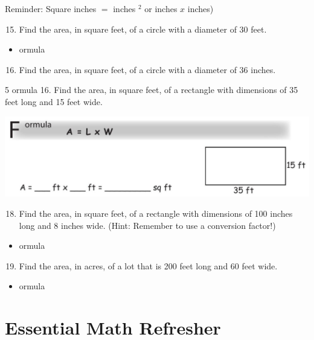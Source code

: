 \documentclass[10pt]{article}
\begin{document}
Reminder: Square inches $=$ inches $^{2}$ or inches $x$ inches)

\begin{enumerate}
  \setcounter{enumi}{14}
  \item Find the area, in square feet, of a circle with a diameter of 30 feet.
\end{enumerate}
\begin{itemize}
  \item ormula
\end{itemize}
\begin{enumerate}
  \setcounter{enumi}{15}
  \item Find the area, in square feet, of a circle with a diameter of 36 inches.
\end{enumerate}
5 ormula 16. Find the area, in square feet, of a rectangle with dimensions of 35 feet long and 15 feet wide.

\includegraphics[max width=\textwidth]{2022_09_16_4d34b76b97ee13a67df7g-21}

\begin{enumerate}
  \setcounter{enumi}{17}
  \item Find the area, in square feet, of a rectangle with dimensions of 100 inches long and 8 inches wide. (Hint: Remember to use a conversion factor!)
\end{enumerate}
\begin{itemize}
  \item ormula
\end{itemize}
\begin{enumerate}
  \setcounter{enumi}{18}
  \item Find the area, in acres, of a lot that is 200 feet long and 60 feet wide.
\end{enumerate}
\begin{itemize}
  \item ormula
\end{itemize}
\section{Essential Math Refresher}
\end{document}
